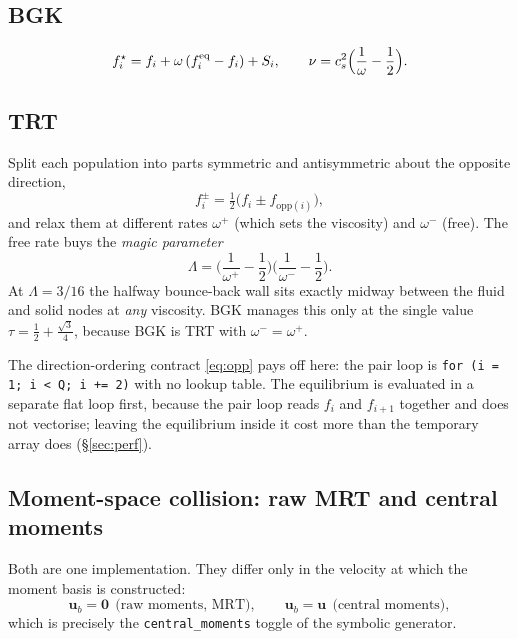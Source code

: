 \documentclass[11pt,a4paper]{article}
\newcommand{\code}[1]{\texttt{\small #1}}
\newcommand{\cs}{c_s}
\newcommand{\uu}{\bm{u}}
\begin{document}
\subsection{BGK}

\begin{equation}
  f_i^{\star} = f_i + \omega\,(f_i^{\rm eq} - f_i) + S_i,
  \qquad \nu = \cs^2\Big(\frac{1}{\omega}-\frac12\Big).
\end{equation}

\subsection{TRT}

Split each population into parts symmetric and antisymmetric about the opposite
direction,
\begin{equation}
  f_i^{\pm} = \tfrac12\big(f_i \pm f_{\mathrm{opp}(i)}\big),
\end{equation}
and relax them at different rates $\omega^{+}$ (which sets the viscosity) and
$\omega^{-}$ (free). The free rate buys the \emph{magic parameter}
\begin{equation}
  \Lambda = \Big(\frac{1}{\omega^{+}}-\frac12\Big)\Big(\frac{1}{\omega^{-}}-\frac12\Big).
  \label{eq:magic}
\end{equation}
At $\Lambda=3/16$ the halfway bounce-back wall sits exactly midway between the
fluid and solid nodes at \emph{any} viscosity. BGK manages this only at the
single value $\tau = \tfrac12+\tfrac{\sqrt3}{4}$, because BGK is TRT with
$\omega^{-}=\omega^{+}$.

The direction-ordering contract \eqref{eq:opp} pays off here: the pair loop is
\code{for (i = 1; i < Q; i += 2)} with no lookup table. The equilibrium is
evaluated in a separate flat loop first, because the pair loop reads $f_i$ and
$f_{i+1}$ together and does not vectorise; leaving the equilibrium inside it cost
more than the temporary array does (\S\ref{sec:perf}).

\subsection{Moment-space collision: raw MRT and central moments}
\label{sec:momentcollision}
\label{sec:moment}

Both are one implementation. They differ only in the velocity at which the moment
basis is constructed:
\begin{equation}
  \uu_b = \bm{0} \ \ \text{(raw moments, MRT)}, \qquad
  \uu_b = \uu \ \ \text{(central moments)},
\end{equation}
which is precisely the \code{central\_moments} toggle of the symbolic generator.
\end{document}
